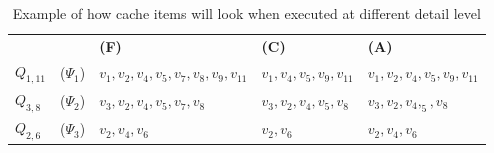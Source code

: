 \begin{table}
\begin{tabular}{@{}l@{}l@{}|@{}l@{}|@{}l@{}|@{}l@{}|@{}}\cline{3-5}
			&		& \bf \;(F)				& \bf \;(C)			& \bf \;(A) \\\cline{3-5}
$Q_{1,11}$		& ($\Psi_1$)	& $v_1,v_2,v_4,v_5,v_7,v_8,v_9,v_{11}$ 	& $v_1,v_4,v_5,v_9,v_{11}$ 	& $v_1,v_2,v_4,v_5,v_9,v_{11}$\\\cline{3-5}
$Q_{3,8}$		& ($\Psi_2$)	& $v_3,v_2,v_4,v_5,v_7,v_8$		& $v_3,v_2,v_4,v_5,v_8$ 	& $v_3,v_2,v_4,_5,v_8$\\\cline{3-5}
$Q_{2,6}$		& ($\Psi_3$)	& $v_2,v_4,v_6$				& $v_2,v_6$			& $v_2,v_4,v_6$\\\cline{3-5}
\end{tabular}
  \caption{Example of how cache items will look when executed at different detail level}
  \label{tab:psilvlcontent}
\end{table}

